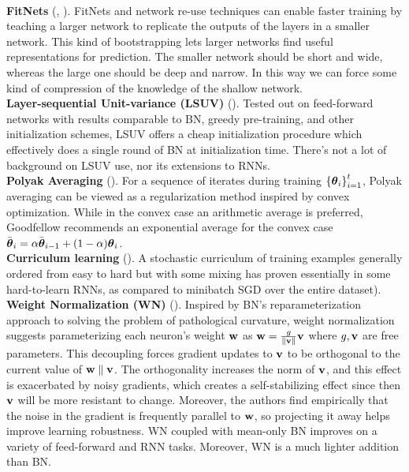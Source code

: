 \documentclass{article}
\begin{document}
\\
\noindent
\textbf{FitNets} (, ). FitNets and network re-use techniques can enable faster training by teaching a larger network to replicate the outputs of the layers in a smaller network. This kind of bootstrapping lets larger networks find useful representations for prediction. The smaller network should be short and wide, whereas the large one should be deep and narrow. In this way we can force some kind of compression of the knowledge of the shallow network.
\\
\noindent
\textbf{Layer-sequential Unit-variance (LSUV)} (). Tested out on feed-forward networks with results comparable to BN, greedy pre-training, and other initialization schemes, LSUV offers a cheap initialization procedure which effectively does a single round of BN at initialization time. There's not a lot of background on LSUV use, nor its extensions to RNNs.
\\
\noindent
\textbf{Polyak Averaging} (). For a sequence of iterates during training $\left\{{{\boldsymbol\theta}_i}\right\}_{i=1}^t$, Polyak averaging can be viewed as a regularization method inspired by convex optimization. While in the convex case an arithmetic average is preferred, Goodfellow recommends an exponential average for the convex case $\bar{{\boldsymbol\theta}}_i=\alpha \bar{{\boldsymbol\theta}}_{i-1}+(1-\alpha){\boldsymbol\theta}_{i}$.
\\
\noindent
\textbf{Curriculum learning} (). A stochastic curriculum of training examples generally ordered from easy to hard but with some mixing has proven essentially in some hard-to-learn RNNs, as compared to minibatch SGD over the entire dataset).
\\
\noindent
\textbf{Weight Normalization (WN)} (). Inspired by BN's reparameterization approach to solving the problem of pathological curvature, weight normalization suggests parameterizing each neuron's weight $\textbf{w}$ as $\textbf{w}=\frac{g}{\left\| \textbf{v} \right\|}\textbf{v}$ where $g,\textbf{v}$ are free parameters. This decoupling forces gradient updates to $\textbf{v}$ to be orthogonal to the current value of $\textbf{w}\parallel\textbf{v}$. The orthogonality increases the norm of $\textbf{v}$, and this effect is exacerbated by noisy gradients, which creates a self-stabilizing effect since then $\textbf{v}$ will be more resistant to change. Moreover, the authors find empirically that the noise in the gradient is frequently parallel to $\textbf{w}$, so projecting it away helps improve learning robustness. WN coupled with mean-only BN improves on a variety of feed-forward and RNN tasks. Moreover, WN is a much lighter addition than BN.
\end{document}
